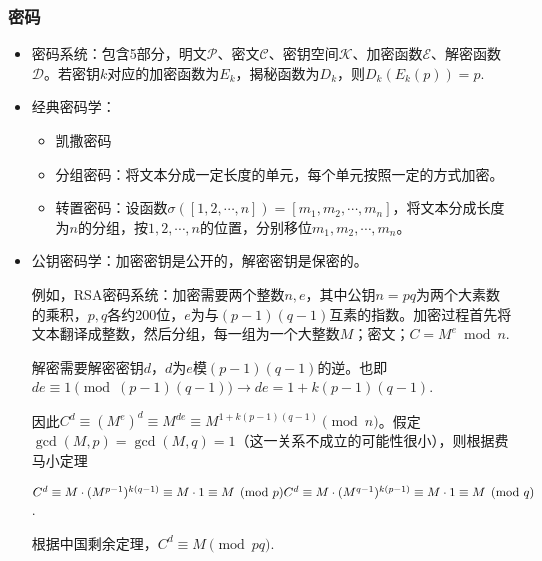 \subsubsection*{密码}
\begin{itemize}
    \item 密码系统：包含5部分，明文$\mathcal P$、密文$\mathcal C$、密钥空间$\mathcal K$、加密函数$\mathcal E$、解密函数$\mathcal D$。若密钥$k$对应的加密函数为$E_k$，揭秘函数为$D_k$，则$D_k(E_k(p)) = p$.

    \item 经典密码学：
    \begin{itemize}
        \item 凯撒密码

        \item 分组密码：将文本分成一定长度的单元，每个单元按照一定的方式加密。
    
        \item 转置密码：设函数$\sigma([1,2,\cdots,n]) = [m_1,m_2, \cdots, m_n]$，将文本分成长度为$n$的分组，按$1,2,\cdots, n$的位置，分别移位$m_1,m_2,\cdots,m_n$。
    \end{itemize}

    \item 公钥密码学：加密密钥是公开的，解密密钥是保密的。

    例如，RSA密码系统：加密需要两个整数$n,e$，其中公钥$n = pq$为两个大素数的乘积，$p,q$各约200位，$e$为与$(p-1)(q-1)$互素的指数。加密过程首先将文本翻译成整数，然后分组，每一组为一个大整数$M$；密文；$C = M^e \bmod n$.

    解密需要解密密钥$d$，$d$为$e$模$(p-1)(q-1)$的逆。也即$de \equiv 1 \pmod {(p-1)(q-1)} \to de = 1 + k(p-1)(q-1)$.

    因此$C^d \equiv (M^e)^d \equiv M^{de} \equiv M^{1+k(p-1)(q-1)} \pmod n$。假定$\gcd (M, p) = \gcd (M,q) = 1$（这一关系不成立的可能性很小），则根据费马小定理
    
    $C^d \equiv M \cdot (M^{p-1})^{k(q-1)} \equiv  M \cdot 1 \equiv M \pmod p \\ C^d \equiv M \cdot (M^{q-1})^{k(p-1)} \equiv  M \cdot 1 \equiv M \pmod q$.

    根据中国剩余定理，$C^d \equiv M \pmod {pq}$.
\end{itemize}

